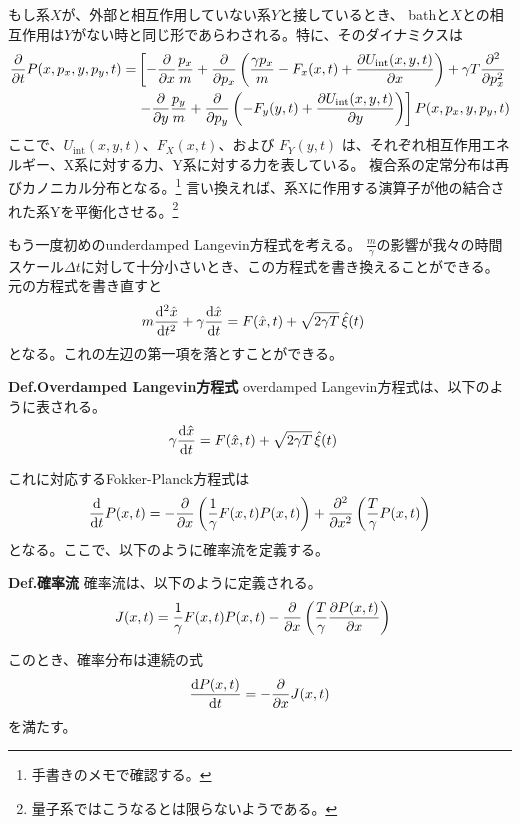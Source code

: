 \documentclass[a4paper,11pt]{jsarticle}
\numberwithin{equation}{section}
\begin{document}
もし系$X$が、外部と相互作用していない系$Y$と接しているとき、
bathと$X$との相互作用は$Y$がない時と同じ形であらわされる。特に、そのダイナミクスは
\begin{align}
\pdv{t} P(x, p_x, y, p_y, t) 
= & \left[
    - \pdv{x} \frac{p_x}{m}
    + \pdv{p_x} \left( \frac{\gamma p_x}{m} - F_x(x, t) + \pdv{U_{\text{int}}(x, y, t)}{x} \right)
    + \gamma T \pdv[2]{p_x}
\right. \nonumber \\
& \left.
    - \pdv{y} \frac{p_y}{m}
    + \pdv{p_y} \left( -F_y(y, t) + \pdv{U_{\text{int}}(x, y, t)}{y} \right)
\right] P(x, p_x, y, p_y, t)
\end{align}
ここで、\( U_{\mathrm{int}}(x, y, t) \)、\( F_X(x, t) \)、および \( F_Y(y, t) \) は、それぞれ相互作用エネルギー、X系に対する力、Y系に対する力を表している。
複合系の定常分布は再びカノニカル分布となる。\footnote{手書きのメモで確認する。}
言い換えれば、系Xに作用する演算子が他の結合された系Yを平衡化させる。\footnote{量子系ではこうなるとは限らないようである。}

もう一度初めのunderdamped Langevin方程式を考える。
$\frac{m}{\gamma} $の影響が我々の時間スケール$\Delta t$に対して十分小さいとき、この方程式を書き換えることができる。
元の方程式を書き直すと
\begin{align}
    m\dv[2]{\hat{x}}{t} + \gamma \dv{\hat{x}}{t} &= F(\hat{x},t) + \sqrt{2\gamma T} \, \hat{\xi}(t)
\end{align}
となる。これの左辺の第一項を落とすことができる。

\begin{itembox}[l]{\textbf{Def.Overdamped Langevin方程式}}
    overdamped Langevin方程式は、以下のように表される。
\begin{align}
    \gamma \dv{\hat{x}}{t} &= F(\hat{x},t) + \sqrt{2\gamma T} \, \hat{\xi}(t)
\end{align}
\end{itembox}
これに対応するFokker-Planck方程式は
\begin{align}
\dv{t} P(x, t) 
= -\pdv{x} \left( \frac{1}{\gamma} F(x, t) P(x, t) \right) 
+ \pdv[2]{x} \left( \frac{T}{\gamma} P(x, t) \right)
\end{align}
となる。ここで、以下のように確率流を定義する。
\begin{itembox}[l]{\textbf{Def.確率流}}
    確率流は、以下のように定義される。
\begin{align}
    J(x,t) &= \frac{1}{\gamma} F(x,t) P(x,t) - \pdv{x} \left( \frac{T}{\gamma} \pdv{P(x,t)}{x} \right)
\end{align}
\end{itembox}
このとき、確率分布は連続の式
\begin{align}
    \dv{P(x,t)}{t} = -\pdv{x} J(x,t)
\end{align}
を満たす。\\
\end{document}
